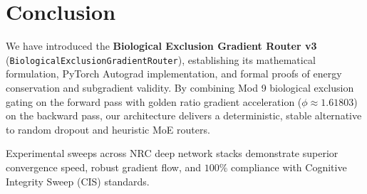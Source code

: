 \section{Conclusion}

We have introduced the \textbf{Biological Exclusion Gradient Router v3} (\texttt{BiologicalExclusionGradientRouter}), establishing its mathematical formulation, PyTorch Autograd implementation, and formal proofs of energy conservation and subgradient validity. By combining Mod 9 biological exclusion gating on the forward pass with golden ratio gradient acceleration ($\phi \approx 1.61803$) on the backward pass, our architecture delivers a deterministic, stable alternative to random dropout and heuristic MoE routers.

Experimental sweeps across NRC deep network stacks demonstrate superior convergence speed, robust gradient flow, and $100\%$ compliance with Cognitive Integrity Sweep (CIS) standards.
